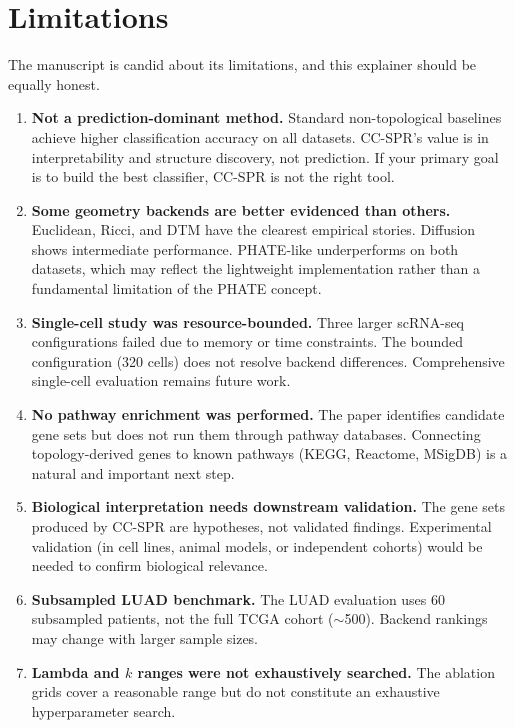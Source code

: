 \documentclass[11pt]{article}
\begin{document}
\section{Limitations}
\label{sec:limitations}

The manuscript is candid about its limitations, and this explainer should be equally honest.

\begin{enumerate}[leftmargin=1.5em]
\item \textbf{Not a prediction-dominant method.}
Standard non-topological baselines achieve higher classification accuracy on all datasets.
CC-SPR's value is in interpretability and structure discovery, not prediction.
If your primary goal is to build the best classifier, CC-SPR is not the right tool.

\item \textbf{Some geometry backends are better evidenced than others.}
Euclidean, Ricci, and DTM have the clearest empirical stories.
Diffusion shows intermediate performance.
PHATE-like underperforms on both datasets, which may reflect the lightweight implementation rather than a fundamental limitation of the PHATE concept.

\item \textbf{Single-cell study was resource-bounded.}
Three larger scRNA-seq configurations failed due to memory or time constraints.
The bounded configuration (320 cells) does not resolve backend differences.
Comprehensive single-cell evaluation remains future work.

\item \textbf{No pathway enrichment was performed.}
The paper identifies candidate gene sets but does not run them through pathway databases.
Connecting topology-derived genes to known pathways (KEGG, Reactome, MSigDB) is a natural and important next step.

\item \textbf{Biological interpretation needs downstream validation.}
The gene sets produced by CC-SPR are hypotheses, not validated findings.
Experimental validation (in cell lines, animal models, or independent cohorts) would be needed to confirm biological relevance.

\item \textbf{Subsampled LUAD benchmark.}
The LUAD evaluation uses 60 subsampled patients, not the full TCGA cohort ($\sim$500).
Backend rankings may change with larger sample sizes.

\item \textbf{Lambda and $k$ ranges were not exhaustively searched.}
The ablation grids cover a reasonable range but do not constitute an exhaustive hyperparameter search.
\end{enumerate}
\end{document}
